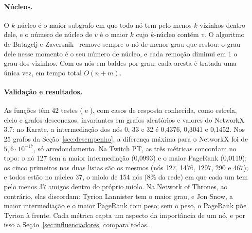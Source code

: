 \paragraph{Núcleos.} O $k$-núcleo é o maior subgrafo em que todo nó tem pelo menos $k$ vizinhos
dentro dele, e o número de núcleo de $v$ é o maior $k$ cujo $k$-núcleo contém $v$. O algoritmo de
Batagelj e Zaversnik~\cite{batagelj2003} remove sempre o nó de menor grau que restou: o grau dele
nesse momento é o seu número de núcleo, e cada remoção diminui em 1 o grau dos vizinhos. Com os nós
em baldes por grau, cada aresta é tratada uma única vez, em tempo total $O(n + m)$.

\paragraph{Validação e resultados.} As funções têm 42 testes ( e ),
com casos de resposta conhecida, como estrela, ciclo e grafos desconexos, invariantes em grafos
aleatórios e valores do NetworkX 3.7: no Karate, a intermediação dos nós 0, 33 e 32 é 0,4376,
0,3041 e 0,1452. Nos 25 grafos
da Seção~\ref{sec:desempenho}, a diferença máxima para o NetworkX foi de $5{,}6 \cdot 10^{-17}$, só
arredondamento. Na Twitch PT, as três métricas concordam no topo: o nó 127 tem a maior intermediação
(0,0993) e o maior PageRank (0,0119); os cinco primeiros nas duas listas são os mesmos (nós 127,
1476, 1297, 290 e 467); e todos estão no núcleo 37, o miolo de 154 nós (8\% da rede) em que cada um
tem pelo menos 37 amigos dentro do próprio miolo. Na Network of Thrones, ao contrário, elas
discordam: Tyrion Lannister tem o maior grau, e Jon Snow, a maior intermediação e o maior PageRank
com peso; sem o peso, o PageRank põe Tyrion à frente. Cada métrica capta um aspecto da importância de um nó,
e por isso a Seção~\ref{sec:influenciadores} compara todas.
